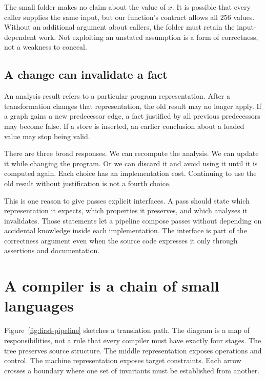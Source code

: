 The small folder makes no claim about the value of $x$.
It is possible that every caller supplies the same input, but our function's contract allows all $256$ values.
Without an additional argument about callers, the folder must retain the input-dependent work.
Not exploiting an unstated assumption is a form of correctness, not a weakness to conceal.

\subsection{A change can invalidate a fact}
\label{sec:analysis-invalidation-introduction}

An analysis result refers to a particular program representation.
After a transformation changes that representation, the old result may no longer apply.
If a graph gains a new predecessor edge, a fact justified by all previous predecessors may become false.
If a store is inserted, an earlier conclusion about a loaded value may stop being valid.

There are three broad responses.
We can recompute the analysis.
We can update it while changing the program.
Or we can discard it and avoid using it until it is computed again.
Each choice has an implementation cost.
Continuing to use the old result without justification is not a fourth choice.

This is one reason to give passes explicit interfaces.
A pass should state which representation it expects, which properties it preserves, and which analyses it invalidates.
Those statements let a pipeline compose passes without depending on accidental knowledge inside each implementation.
The interface is part of the correctness argument even when the source code expresses it only through assertions and documentation.

\section{A compiler is a chain of small languages}
\label{sec:compiler-phase-contracts}

Figure~\ref{fig:first-pipeline} sketches a translation path.
The diagram is a map of responsibilities, not a rule that every compiler must have exactly four stages.
The tree preserves source structure.
The middle representation exposes operations and control.
The machine representation exposes target constraints.
Each arrow crosses a boundary where one set of invariants must be established from another.

